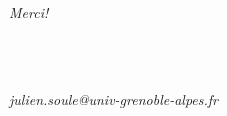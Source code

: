 

\section*{\phantom{Thanks}}

\begin{frame}{}

  \vspace{6ex}

  \centering
  {
    \Huge
    \emph{Merci!}
  }

  \vspace{3ex}

  \ \\
  
  \

  \textit{julien.soule@univ-grenoble-alpes.fr}

\end{frame}
